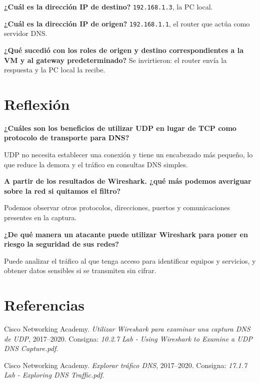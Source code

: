 \documentclass[12pt,a4paper]{article}
\begin{document}
\par\textbf{¿Cuál es la dirección IP de destino?}
\texttt{192.168.1.3}, la PC local.

\par\textbf{¿Cuál es la dirección IP de origen?}
\texttt{192.168.1.1}, el router que actúa como servidor DNS.

\par\textbf{¿Qué sucedió con los roles de origen y destino correspondientes a la VM y al gateway predeterminado?}
Se invirtieron: el router envía la respuesta y la PC local la recibe.

\section{Reflexión}
\par\textbf{¿Cuáles son los beneficios de utilizar UDP en lugar de TCP como protocolo de transporte para DNS?}

UDP no necesita establecer una conexión y tiene un encabezado más pequeño, lo que reduce la demora y el tráfico en consultas DNS simples.

\par\textbf{A partir de los resultados de Wireshark. ¿qué más podemos averiguar sobre la red si quitamos el filtro?}

Podemos observar otros protocolos, direcciones, puertos y comunicaciones presentes en la captura.

\par\textbf{¿De qué manera un atacante puede utilizar Wireshark para poner en riesgo la seguridad de sus redes?}

Puede analizar el tráfico al que tenga acceso para identificar equipos y servicios, y obtener datos sensibles si se transmiten sin cifrar.

\newpage
\section{Referencias}
Cisco Networking Academy. \textit{Utilizar Wireshark para examinar una captura DNS de UDP}, 2017--2020. Consigna: \textit{10.2.7 Lab - Using Wireshark to Examine a UDP DNS Capture.pdf}.
\par Cisco Networking Academy. \textit{Explorar tráfico DNS}, 2017--2020. Consigna: \textit{17.1.7 Lab - Exploring DNS Traffic.pdf}.
\end{document}
